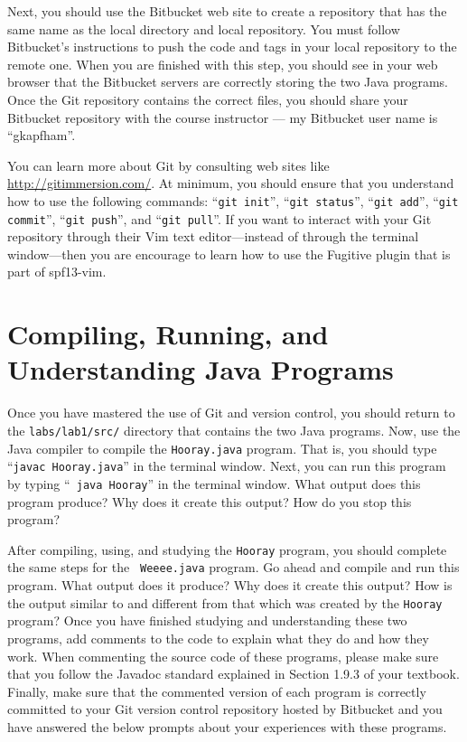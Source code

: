Next, you should use the Bitbucket web site to create a repository that has the same name as the local directory and
local repository.  You must follow Bitbucket's instructions to push the code and tags in your local repository to the
remote one. When you are finished with this step, you should see in your web browser that the Bitbucket servers are
correctly storing the two Java programs. Once the Git repository contains the correct files, you should share your Bitbucket
repository with the course instructor --- my Bitbucket user name is ``gkapfham''.

You can learn more about Git by consulting web sites like  \url{http://gitimmersion.com/}.  At minimum, you should
ensure that you understand how to use the following commands: ``{\tt git init}'', ``{\tt git status}'', ``{\tt git
add}'', ``{\tt git commit}'', ``{\tt git push}'', and ``{\tt git pull}''. If you want to interact with your Git
repository through their Vim text editor---instead of through the terminal window---then you are encourage to learn how
to use the Fugitive plugin that is part of spf13-vim.

\section*{Compiling, Running, and Understanding Java Programs}

Once you have mastered the use of Git and version control, you should return to the {\tt labs/lab1/src/} directory
that contains the two Java programs. Now, use the Java compiler to compile the {\tt Hooray.java} program.  That is,
you should type ``{\tt javac Hooray.java}'' in the terminal window.  Next, you can run this program by typing ``{\tt
java Hooray}'' in the terminal window.  What output does this program produce?  Why does it create this output? How
do you stop this program?

After compiling, using, and studying the {\tt Hooray} program, you should complete the same steps for the {\tt
Weeee.java} program. Go ahead and compile and run this program. What output does it produce? Why does it create this
output? How is the output similar to and different from that which was created by the {\tt Hooray} program? Once you
have finished studying and understanding these two programs, add comments to the code to explain what they do and how
they work. When commenting the source code of these programs, please make sure that you follow the Javadoc standard
explained in Section 1.9.3 of your textbook. Finally, make sure that the commented version of each program is correctly
committed to your Git version control repository hosted by Bitbucket and you have answered the below prompts about your
experiences with these programs.

